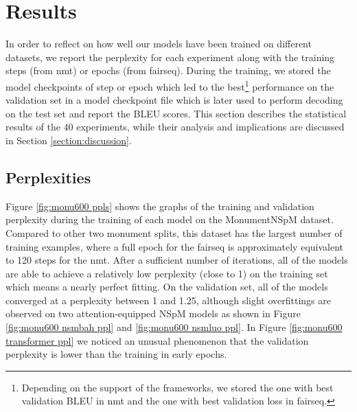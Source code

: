 \section{Results} \label{section:results}

In order to reflect on how well our models have been trained on different datasets, we report the perplexity for each experiment along with the training steps (from nmt) or epochs (from fairseq). During the training, we stored the model checkpoints of step or epoch which led to the best\footnote{Depending on the support of the frameworks, we stored the one with best validation BLEU in nmt and the one with best validation loss in fairseq.} performance on the validation set in a model checkpoint file which is later used to perform decoding on the test set and report the BLEU scores. This section describes the statistical results of the 40 experiments, while their analysis and implications are discussed in Section \ref{section:discussion}.

\subsection{Perplexities} \label{subsection:perplexity}

Figure \ref{fig:monu600 ppls} shows the graphs of the training and validation perplexity during the training of each model on the MonumentNSpM dataset. Compared to other two monument splits, this dataset has the largest number of training examples, where a full epoch for the fairseq is approximately equivalent to 120 steps for the nmt. After a sufficient number of iterations, all of the models are able to achieve a relatively low perplexity (close to 1) on the training set which means a nearly perfect fitting. On the validation set, all of the models converged at a perplexity between 1 and 1.25, although slight overfittings are observed on two attention-equipped NSpM models as shown in Figure \ref{fig:monu600 nsmbah ppl} and \ref{fig:monu600 nsmluo ppl}. In Figure \ref{fig:monu600 transformer ppl} we noticed an unusual phenomenon that the validation perplexity is lower than the training in early epochs.

